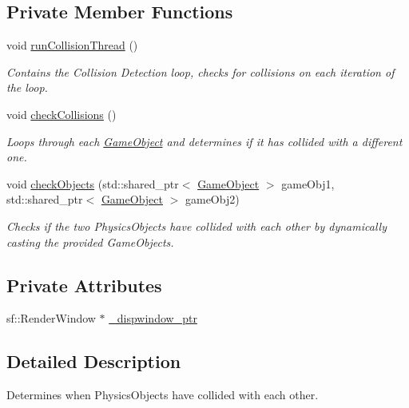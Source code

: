 \subsection*{Private Member Functions}
\begin{DoxyCompactItemize}
\item 
\mbox{\label{class_collision_detection_a1eda3727a959c4aa24fad3ef46a7b530}} 
void \hyperlink{class_collision_detection_a1eda3727a959c4aa24fad3ef46a7b530}{run\+Collision\+Thread} ()
\begin{DoxyCompactList}\small\item\em Contains the Collision Detection loop, checks for collisions on each iteration of the loop. \end{DoxyCompactList}\item 
void \hyperlink{class_collision_detection_a9b39c9264288db71452ce2f66a79c4f1}{check\+Collisions} ()
\begin{DoxyCompactList}\small\item\em Loops through each \hyperlink{class_game_object}{Game\+Object} and determines if it has collided with a different one. \end{DoxyCompactList}\item 
void \hyperlink{class_collision_detection_a5c7daf7f877c7f9418d36944c4728b75}{check\+Objects} (std\+::shared\+\_\+ptr$<$ \hyperlink{class_game_object}{Game\+Object} $>$ game\+Obj1, std\+::shared\+\_\+ptr$<$ \hyperlink{class_game_object}{Game\+Object} $>$ game\+Obj2)
\begin{DoxyCompactList}\small\item\em Checks if the two Physics\+Objects have collided with each other by dynamically casting the provided Game\+Objects. \end{DoxyCompactList}\end{DoxyCompactItemize}
\subsection*{Private Attributes}
\begin{DoxyCompactItemize}
\item 
sf\+::\+Render\+Window $\ast$ \hyperlink{class_collision_detection_a7a894b4bc38b6987d4cf8135df01d83b}{\+\_\+dispwindow\+\_\+ptr}
\end{DoxyCompactItemize}


\subsection{Detailed Description}
Determines when Physics\+Objects have collided with each other. 

